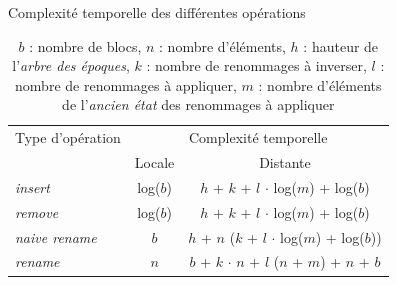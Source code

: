 \documentclass[12pt]{thesul}
\begin{document}
\begin{table}[!ht]
  \centering
  \caption{Complexité temporelle des différentes opérations}
  \label{tab:time-complexity-operations-with-revertRenameId}
  \begin{tabular}{lcc}
      \toprule
      Type d'opération & \multicolumn{2}{c}{Complexité temporelle} \\
      \cmidrule(lr){2-3}
        & Locale &   Distante \\
      \midrule
      \emph{insert} & log($b$) & $h$ + $k$ + $l$ $\cdot$ log($m$) + log($b$) \\
      \emph{remove} & log($b$) & $h$ + $k$ + $l$ $\cdot$ log($m$) + log($b$) \\
      \emph{naive rename} & $b$ & $h$ + $n$ ($k$ + $l$ $\cdot$ log($m$) + log($b$)) \\
      \emph{rename} & $n$ & $b$ + $k$ $\cdot$ $n$ + $l$ ($n$ + $m$) + $n$ + $b$ \\
      \bottomrule
  \end{tabular}
  \caption*{$b$ : nombre de blocs, $n$ : nombre d'éléments, $h$ : hauteur de l'\emph{arbre des époques}, $k$ : nombre de renommages à inverser, $l$ : nombre de renommages à appliquer, $m$ : nombre d'éléments de l'\emph{ancien état} des renommages à appliquer}
\end{table}
\end{document}
